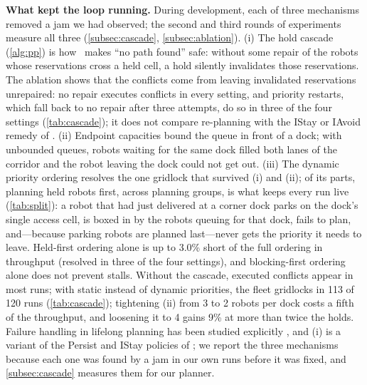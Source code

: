 \noindent\textbf{What kept the loop running.}
During development, each of three mechanisms removed a jam we had observed;
the second and third rounds of experiments measure all three (\cref{subsec:cascade},
\cref{subsec:ablation}). (i) The hold
cascade (\cref{alg:pp}) is how \sname\ makes ``no path found'' safe: without
some repair of the robots whose reservations cross a held cell, a hold
silently invalidates those reservations. The ablation shows that the
conflicts come from leaving invalidated reservations unrepaired: no repair
executes conflicts in every setting, and priority restarts, which fall back
to no repair after three attempts, do so in three of the four settings
(\cref{tab:cascade}); it does not compare re-planning with the IStay or
IAvoid remedy of \citet{morag2023adapting}. (ii) Endpoint capacities bound the queue in front of a
dock; with unbounded queues, robots waiting for the same dock filled both
lanes of the corridor and the robot leaving the dock could not get out.
(iii) The dynamic priority ordering resolves the one
gridlock that survived (i) and (ii); of its parts, planning held robots first,
across planning groups, is what keeps every run live (\cref{tab:split}): a robot that had just delivered at a
corner dock parks on the dock's single access cell, is boxed in by the robots
queuing for that dock, fails to plan, and---because parking robots are
planned last---never gets the priority it needs to leave. Held-first ordering
alone is up to 3.0\% short of the full ordering in throughput (resolved in three of the
four settings), and blocking-first
ordering alone does not prevent stalls. Without the
cascade, executed conflicts appear in most runs; with static instead of
dynamic priorities, the fleet gridlocks in 113 of 120 runs
(\cref{tab:cascade}); tightening (ii) from 3 to 2 robots per dock costs a
fifth of the throughput, and loosening it to 4 gains 9\% at more than twice the
holds. Failure handling in lifelong planning has been studied explicitly
\citep{morag2023adapting,yan2026lsmart,tang2026energy}, and (i) is a
variant of the Persist and IStay policies of \citet{morag2023adapting}; we report the
three mechanisms because each one was found by a jam in our own runs before
it was fixed, and \cref{subsec:cascade} measures them for our planner.

